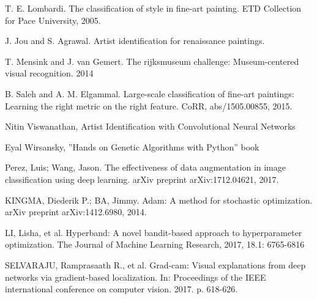 \begin{thebibliography}{1}


T. E. Lombardi. The classification of style in fine-art painting. ETD Collection for Pace University, 2005.

J. Jou and S. Agrawal. Artist identification for renaissance paintings.

T. Mensink and J. van Gemert. The rijksmuseum challenge: Museum-centered visual recognition. 2014

B. Saleh and A. M. Elgammal. Large-scale classification of fine-art paintings: Learning the right metric on the right feature. CoRR, abs/1505.00855, 2015.

Nitin Viswanathan, Artist Identification with Convolutional Neural Networks

Eyal Wirsansky, ”Hands on Genetic Algorithms with Python” book

Perez, Luis; Wang, Jason. The effectiveness of data augmentation in image classification using deep learning. arXiv preprint arXiv:1712.04621, 2017.

KINGMA, Diederik P.; BA, Jimmy. Adam: A method for stochastic optimization. arXiv preprint arXiv:1412.6980, 2014.

LI, Lisha, et al. Hyperband: A novel bandit-based approach to hyperparameter optimization. The Journal
of Machine Learning Research, 2017, 18.1: 6765-6816

SELVARAJU, Ramprasaath R., et al. Grad-cam: Visual explanations from deep networks via gradient-based localization. In: Proceedings of the IEEE international conference on computer vision. 2017. p. 618-626.

\end{thebibliography}
